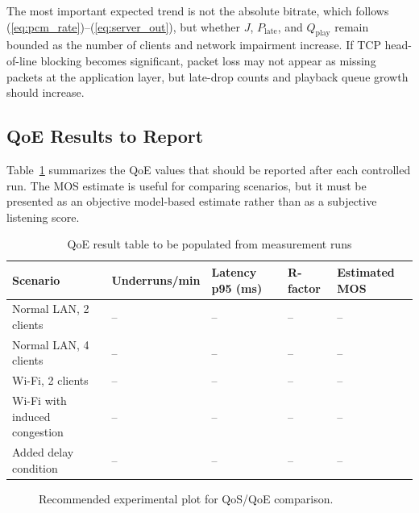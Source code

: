 \documentclass[conference]{IEEEtran}
\begin{document}
The most important expected trend is not the absolute bitrate, which follows (\ref{eq:pcm_rate})--(\ref{eq:server_out}), but whether $J$, $P_{\mathrm{late}}$, and $Q_{\mathrm{play}}$ remain bounded as the number of clients and network impairment increase. If TCP head-of-line blocking becomes significant, packet loss may not appear as missing packets at the application layer, but late-drop counts and playback queue growth should increase.

\subsection{QoE Results to Report}

Table~\ref{tab:qoe_results} summarizes the QoE values that should be reported after each controlled run. The MOS estimate is useful for comparing scenarios, but it must be presented as an objective model-based estimate rather than as a subjective listening score.

\begin{table}[H]
\centering
\caption{QoE result table to be populated from measurement runs}
\label{tab:qoe_results}
\renewcommand{\arraystretch}{1.15}
\begin{tabularx}{\columnwidth}{lXXXX}
\toprule
\textbf{Scenario} & \textbf{Underruns/min} & \textbf{Latency p95 (ms)} & \textbf{R-factor} & \textbf{Estimated MOS} \\
\midrule
Normal LAN, 2 clients & -- & -- & -- & -- \\
Normal LAN, 4 clients & -- & -- & -- & -- \\
Wi-Fi, 2 clients & -- & -- & -- & -- \\
Wi-Fi with induced congestion & -- & -- & -- & -- \\
Added delay condition & -- & -- & -- & -- \\
\bottomrule
\end{tabularx}
\end{table}

\begin{figure}[H]
    \centering
    \caption{Recommended experimental plot for QoS/QoE comparison.}
    \label{fig:results}
\end{figure}
\end{document}
